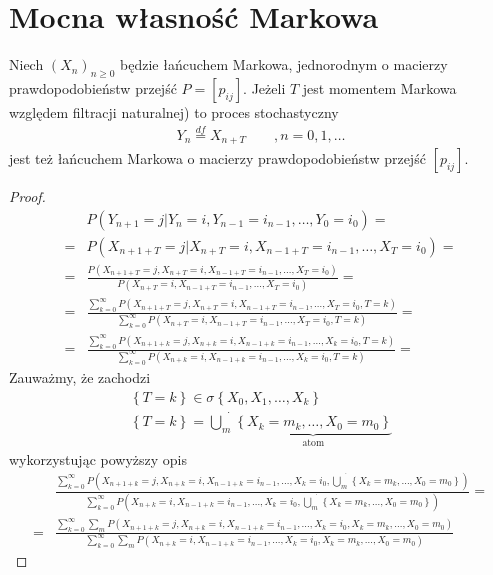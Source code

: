 \section{Mocna własność Markowa}
\begin{twr}
Niech $ \left(X_n\right)_{n\ge0 } $ będzie łańcuchem Markowa, jednorodnym o macierzy prawdopodobieństw przejść $ P=\left[p_{ij}\right] $. Jeżeli $ T $ jest momentem Markowa względem filtracji naturalnej) to proces stochastyczny
\begin{gather*}
Y_n\stackrel{df}{=}X_{n+T}\qquad,n=0,1,\dots 
\end{gather*}
jest też łańcuchem Markowa o macierzy prawdopodobieństw przejść $ \left[p_{ij}\right] $.
\begin{proof}
\begin{align*}
&P\left(Y_{n+1}=j|Y_n=i,Y_{n-1}=i_{n-1},\dots,Y_0=i_0\right)
=\\=&
P\left(X_{n+1+T}=j|X_{n+T}=i,X_{n-1+T}=i_{n-1},\dots,X_T=i_0\right)
=\\=&
\frac{P\left(X_{n+1+T}=j,X_{n+T}=i,X_{n-1+T}=i_{n-1},\dots,X_T=i_0\right)}{P\left(X_{n+T}=i,X_{n-1+T}=i_{n-1},\dots,X_T=i_0\right)}
=\\=&
\frac{\sum_{k=0}^{\infty }P\left(X_{n+1+T}=j,X_{n+T}=i,X_{n-1+T}=i_{n-1},\dots,X_T=i_0,T=k\right)}{\sum_{k=0}^{\infty }P\left(X_{n+T}=i,X_{n-1+T}=i_{n-1},\dots,X_T=i_0,T=k\right)}
=\\=&
\frac{\sum_{k=0}^{\infty }P\left(X_{n+1+k}=j,X_{n+k}=i,X_{n-1+k}=i_{n-1},\dots,X_k=i_0,T=k\right)}{\sum_{k=0}^{\infty }P\left(X_{n+k}=i,X_{n-1+k}=i_{n-1},\dots,X_k=i_0,T=k\right)}=
\end{align*}
Zauważmy, że zachodzi
\begin{gather*}
\left\{T=k\right\}\in\sigma\left\{X_0,X_1,\dots,X_k\right\}\\
\left\{T=k\right\}=\dot {\bigcup_m}\underbrace{\left\{X_k=m_k,\dots,X_0=m_0\right\}}_{\text{atom}}
\end{gather*}
wykorzystując powyższy opis
\begin{align*}
&\frac{\sum_{k=0}^{\infty }P\left(X_{n+1+k}=j,X_{n+k}=i,X_{n-1+k}=i_{n-1},\dots,X_k=i_0,\dot {\bigcup\limits_m}\left\{X_k=m_k,\dots,X_0=m_0\right\}\right)}
{\sum_{k=0}^{\infty }P\left(X_{n+k}=i,X_{n-1+k}=i_{n-1},\dots,X_k=i_0,\dot {\bigcup\limits_m}\left\{X_k=m_k,\dots,X_0=m_0\right\}\right)}
=\\=&
\frac{\sum_{k=0}^{\infty }\sum_mP\left(X_{n+1+k}=j,X_{n+k}=i,X_{n-1+k}=i_{n-1},\dots,X_k=i_0,X_k=m_k,\dots,X_0=m_0\right)}
{\sum_{k=0}^{\infty }\sum_mP\left(X_{n+k}=i,X_{n-1+k}=i_{n-1},\dots,X_k=i_0,X_k=m_k,\dots,X_0=m_0\right)}

\end{align*}
\end{proof}
\end{twr}
